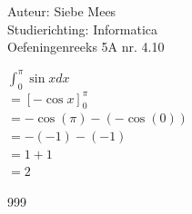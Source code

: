 \documentclass[a4paper]{article}
\begin{document}
  
\noindent \large Auteur: Siebe Mees \\
\noindent \large Studierichting: Informatica\\
\noindent \large Oefeningenreeks 5A nr. 4.10\\

\medskip

\normalsize

$ \displaystyle\int_{0}^{\pi} \sin x dx $\\

$ = \left[ -\cos x \right]_{0}^{\pi} $\\

$ = -\cos(\pi) - ( -\cos(0) ) $\\

$ = -(-1) - ( -1 ) $\\

$ = 1 + 1 $\\

$ = 2 $\\
\begin{thebibliography}{999}
\end{thebibliography}
\end{document}
